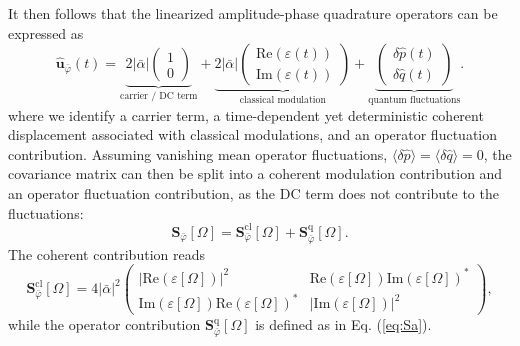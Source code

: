 It then follows that the linearized amplitude-phase quadrature operators can be expressed as
\begin{equation}
\mathbf{\hat u}_{\bar{\varphi}}(t)
=
\underbrace{
2|\bar{\alpha}|
\begin{pmatrix}
1\\
0
\end{pmatrix}
}_{\text{carrier / DC term}}
+
\underbrace{
2|\bar{\alpha}|
\begin{pmatrix}
\mathrm{Re}\!\left(\varepsilon(t)\right)\\
\mathrm{Im}\!\left(\varepsilon(t)\right)
\end{pmatrix}
}_{\text{classical modulation}}
+
\underbrace{
\begin{pmatrix}
\delta \hat p(t)\\
\delta \hat q(t)
\end{pmatrix}
}_{\text{quantum fluctuations}}.
\end{equation}
where we identify a carrier term, a time-dependent  yet deterministic coherent displacement associated with classical modulations, and an operator fluctuation contribution. Assuming vanishing mean operator fluctuations,
$\langle \delta \hat p\rangle=\langle \delta \hat q\rangle=0$, the covariance matrix can then be split into a coherent modulation contribution and an operator fluctuation contribution, as the DC term does not contribute to the fluctuations:
\begin{equation}
    \mathbf S_{\bar{\varphi}}[\Omega]
    =
    \mathbf S_{\bar{\varphi}}^{\mathrm{cl}}[\Omega]
    +
    \mathbf S_{\bar{\varphi}}^{\mathrm{q}}[\Omega].
\label{eq:modulated_field_fluctuationn}
\end{equation}
The coherent contribution reads
\begin{equation}
    \mathbf S_{\bar{\varphi}}^{\mathrm{cl}}[\Omega]
    =
    4|\bar{\alpha}|^2
    \begin{pmatrix}
        \left|\mathrm{Re}\!\left(\varepsilon[\Omega]\right)\right|^2
        &
        \mathrm{Re}\!\left(\varepsilon[\Omega]\right)
        \mathrm{Im}\!\left(\varepsilon[\Omega]\right)^*
        \\[2mm]
        \mathrm{Im}\!\left(\varepsilon[\Omega]\right)
        \mathrm{Re}\!\left(\varepsilon[\Omega]\right)^*
        &
        \left|\mathrm{Im}\!\left(\varepsilon[\Omega]\right)\right|^2
    \end{pmatrix},
\end{equation}
while the operator contribution $\mathbf S_{\bar{\varphi}}^{\mathrm{q}}[\Omega]$ is defined as in Eq. (\ref{eq:Sa}). 

